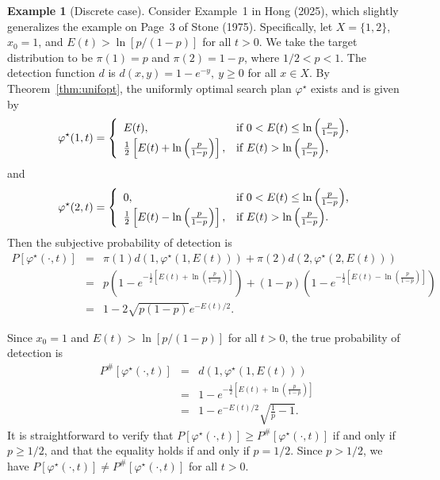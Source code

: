 \documentclass[12pt]{article}
\theoremstyle{plain}
\theoremstyle{definition}
\newtheorem{example}{Example}%
\theoremstyle{remark}
\begin{document}
\begin{example}[Discrete case]
\label{ex:discrete2}
Consider Example~1 in Hong (2025), which slightly generalizes the example on Page~3 of Stone (1975).  Specifically, let $X=\{1, 2\}$, $x_0=1$, and $E(t)>\ln [p/(1-p)]$ for all $t>0$.   We take the target distribution to be $\pi(1)=p$ and $\pi(2)=1-p$, where $1/2<p<1$.  The detection function $d$  is $d(x, y)=1-e^{-y}, \ y\geq 0$ for all $x\in X$.  By Theorem~\ref{thm:unifopt},  the uniformly optimal search plan $\varphi^\star$ exists and is given by
\[\varphi^\star (1, t)=\left\{
		                           \begin{array}{ll}
		                            E(t),  & \hbox{if $0<E(t)\leq  \ln \left(\frac{p}{1-p}\right) $,} \\
					 \frac{1}{2}\left[E(t)+\ln \left(\frac{p}{1-p}\right) \right],  & \hbox{if $E(t)>\ln \left(\frac{p}{1-p}\right) $,} 
		                          \end{array}
		                         \right.
		                         \]
and 
\[\varphi^\star (2, t)=\left\{
		                           \begin{array}{ll}
		                          0,  & \hbox{if $0< E(t) \leq \ln \left(\frac{p}{1-p}\right) $,} \\
					 \frac{1}{2}\left[E(t)-\ln \left(\frac{p}{1-p}\right) \right],  & \hbox{if $E(t)>\ln \left(\frac{p}{1-p}\right)$.} 
		                          \end{array}
		                         \right.
		                         \]
		                         Then the subjective probability of detection is
\begin{eqnarray*}
P[\varphi^\star(\cdot, t)] &=& \pi(1) d(1,  \varphi^\star (1, E(t)))+\pi(2)d(2, \varphi^\star (2, E(t)))\\
			&=& p\left(1-e^{- \frac{1}{2}\left[E(t)+\ln \left(\frac{p}{1-p}\right) \right]}\right)+(1-p)\left(1-e^{- \frac{1}{2}\left[E(t)-\ln \left(\frac{p}{1-p}\right) \right]}\right) \\
			&=& 1-2\sqrt{p(1-p)}e^{-E(t)/2}.
\end{eqnarray*}


Since $x_0=1$ and $E(t)>\ln [p/(1-p)]$ for all $t>0$,  the true probability of detection is 
\begin{eqnarray*}
P^{\#}[\varphi^\star(\cdot, t)]&=&  d(1,  \varphi^\star (1, E(t)))\\
				&=& 1-e^{- \frac{1}{2}\left[E(t)+\ln \left(\frac{p}{1-p}\right) \right]}\\
				&=& 1-e^{-E(t)/2}\sqrt{\frac{1}{p}-1}.				
\end{eqnarray*}
It is straightforward to verify that $P[\varphi^\star(\cdot, t)] \geq P^{\#}[\varphi^\star(\cdot, t)] $ if and only if $p\geq 1/2$, and that the equality holds if and only if $p=1/2$.   Since $p>1/2$, we have $P[\varphi^\star(\cdot, t)]\neq P^{\#}[\varphi^\star(\cdot, t)]$ for all $t>0$.  
\end{example}
\end{document}
